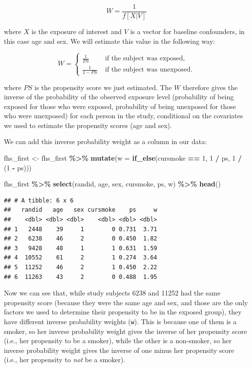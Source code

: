 \documentclass[
]{book}
\newenvironment{Shaded}{\begin{snugshade}}{\end{snugshade}}
\newcommand{\AttributeTok}[1]{\textcolor[rgb]{0.13,0.29,0.53}{#1}}
\newcommand{\DecValTok}[1]{\textcolor[rgb]{0.00,0.00,0.81}{#1}}
\newcommand{\FunctionTok}[1]{\textcolor[rgb]{0.13,0.29,0.53}{\textbf{#1}}}
\newcommand{\NormalTok}[1]{#1}
\newcommand{\OtherTok}[1]{\textcolor[rgb]{0.56,0.35,0.01}{#1}}
\newcommand{\SpecialCharTok}[1]{\textcolor[rgb]{0.81,0.36,0.00}{\textbf{#1}}}
\begin{document}
\[
W=\frac{1}{f[X|V]}
\]

where \(X\) is the exposure of interest and \(V\) is a vector for baseline confounders, in this case age and sex. We will estimate this value in the following way:

\[
W = \begin{cases}
\frac{1}{PS} &\mbox{ if the subject was exposed},\\
\frac{1}{1-PS} &\mbox{ if the subject was unexposed.}
\end{cases}
\]

where \(PS\) is the propensity score we just estimated. The \(W\) therefore gives the inverse of the probability of the observed exposure level (probability of being exposed for those who were exposed, probability of being unexposed for those who were unexposed) for each person in the study, conditional on the covariates we used to estimate the propensity scores (age and sex).

We can add this inverse probability weight as a column in our data:

\begin{Shaded}
\begin{Highlighting}[]
\NormalTok{fhs\_first }\OtherTok{\textless{}{-}}\NormalTok{ fhs\_first }\SpecialCharTok{\%\textgreater{}\%} 
  \FunctionTok{mutate}\NormalTok{(}\AttributeTok{w =} \FunctionTok{if\_else}\NormalTok{(cursmoke }\SpecialCharTok{==} \DecValTok{1}\NormalTok{, }\DecValTok{1} \SpecialCharTok{/}\NormalTok{ ps, }\DecValTok{1} \SpecialCharTok{/}\NormalTok{ (}\DecValTok{1} \SpecialCharTok{{-}}\NormalTok{ ps)))}

\NormalTok{fhs\_first }\SpecialCharTok{\%\textgreater{}\%} 
  \FunctionTok{select}\NormalTok{(randid, age, sex, cursmoke, ps, w) }\SpecialCharTok{\%\textgreater{}\%} 
  \FunctionTok{head}\NormalTok{()}
\end{Highlighting}
\end{Shaded}

\begin{verbatim}
## # A tibble: 6 x 6
##   randid   age   sex cursmoke    ps     w
##    <dbl> <dbl> <dbl>    <dbl> <dbl> <dbl>
## 1   2448    39     1        0 0.731  3.71
## 2   6238    46     2        0 0.450  1.82
## 3   9428    48     1        1 0.631  1.59
## 4  10552    61     2        1 0.274  3.64
## 5  11252    46     2        1 0.450  2.22
## 6  11263    43     2        0 0.488  1.95
\end{verbatim}

Now we can see that, while study subjects 6238 and 11252 had the same propensity score (because they were the same age and sex, and those are the only factors we used to determine their propensity to be in the exposed group), they have different inverse probability weights (\texttt{w}). This is because one of them is a smoker, so her inverse probability weight gives the inverse of her propensity score (i.e., her propensity to be a smoker), while the other is a non-smoker, so her inverse probability weight gives the inverse of one minus her propensity score (i.e., her propensity to \emph{not} be a smoker).
\end{document}
